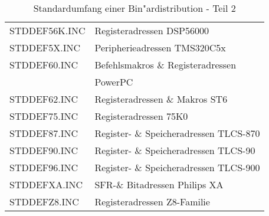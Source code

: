 \documentclass[12pt,a4paper,twoside]{report}
\begin{document}
\begin{table*}[htp]
\begin{center}
\begin{tabular}{|l|l|}
STDDEF56K.INC     & Registeradressen DSP56000 \\
STDDEF5X.INC      & Peripherieadressen TMS320C5x \\
STDDEF60.INC      & Befehlsmakros \& Registeradressen \\
                  & PowerPC \\
STDDEF62.INC      & Registeradressen \& Makros ST6 \\
STDDEF75.INC      & Registeradressen 75K0 \\
STDDEF87.INC      & Register- \& Speicheradressen TLCS-870 \\
STDDEF90.INC      & Register- \& Speicheradressen TLCS-90 \\
STDDEF96.INC      & Register- \& Speicheradressen TLCS-900 \\
STDDEFXA.INC      & SFR-\& Bitadressen Philips XA \\
STDDEFZ8.INC      & Registeradressen Z8-Familie \\
\hline
\end{tabular}\end{center}
\caption{Standardumfang einer Bin"ardistribution - Teil 2
         \label{TabCommonPackageList2}}
\end{table*}
\end{document}
